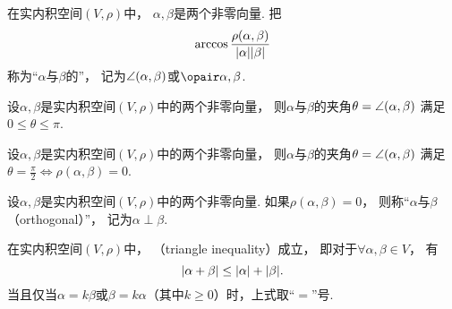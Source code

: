 \begin{definition}
在实内积空间\((V,\rho)\)中，
\(\alpha,\beta\)是两个非零向量.
把\begin{equation}
	\arccos\frac{\rho(\alpha,\beta)}{\abs{\alpha} \abs{\beta}}
\end{equation}
称为“\(\alpha\)与\(\beta\)的”，
记为\(\angle(\alpha,\beta)\)或\(\VectorAngleP{\alpha}{\beta}\).
\end{definition}

\begin{property}
设\(\alpha,\beta\)是实内积空间\((V,\rho)\)中的两个非零向量，
则\(\alpha\)与\(\beta\)的夹角\(\theta = \angle(\alpha,\beta)\)
满足\(0 \leq \theta \leq \pi\).
\end{property}

\begin{property}
设\(\alpha,\beta\)是实内积空间\((V,\rho)\)中的两个非零向量，
则\(\alpha\)与\(\beta\)的夹角\(\theta = \angle(\alpha,\beta)\)
满足\(\theta = \frac\pi2 \iff \rho(\alpha,\beta) = 0\).
\end{property}

\begin{definition}
设\(\alpha,\beta\)是实内积空间\((V,\rho)\)中的两个非零向量.
如果\(\rho(\alpha,\beta) = 0\)，
则称“\(\alpha\)与\(\beta\) （orthogonal）”，
记为\(\alpha \perp \beta\).
\end{definition}

\begin{corollary}\label{theorem:实内积空间.三角不等式}
在实内积空间\((V,\rho)\)中，
（triangle inequality）成立，
即对于\(\forall \alpha,\beta \in V\)，
有\begin{equation}
	\abs{\alpha+\beta} \leq \abs{\alpha} + \abs{\beta}.
\end{equation}
当且仅当\(\alpha = k\beta\)或\(\beta = k\alpha\)（其中\(k\geq0\)）时，上式取“\(=\)”号.
\end{corollary}


